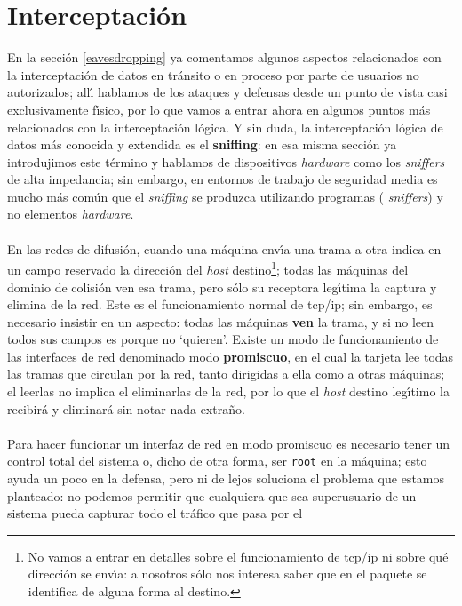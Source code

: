 \section{Interceptaci\'on}
En la secci\'on \ref{eavesdropping} ya comentamos algunos aspectos relacionados
con la interceptaci\'on de datos en tr\'ansito o en proceso por parte de
usuarios no autorizados; all\'{\i} hablamos de los ataques y defensas desde un 
punto de vista casi exclusivamente f\'{\i}sico, por lo que vamos a entrar
ahora en algunos puntos m\'as relacionados con la interceptaci\'on l\'ogica. Y
sin duda, la interceptaci\'on l\'ogica de datos m\'as conocida y extendida es 
el {\bf sniffing}: en esa misma secci\'on ya introdujimos este t\'ermino y 
hablamos de dispositivos {\it hardware} como los {\it sniffers} de alta 
impedancia; sin embargo, en entornos de trabajo de seguridad media es mucho 
m\'as com\'un que el {\it sniffing} se produzca utilizando programas ({\it
sniffers}) y no elementos {\it hardware}.\\
\\En las redes de difusi\'on, cuando una m\'aquina env\'{\i}a una trama a otra
indica en un campo reservado la direcci\'on del {\it host} destino\footnote{No 
vamos a entrar en detalles sobre el funcionamiento de {\sc tcp/ip} ni sobre 
qu\'e direcci\'on se env\'{\i}a: a nosotros s\'olo nos interesa saber que en el 
paquete se identifica de alguna forma al destino.}; todas las m\'aquinas del
dominio de colisi\'on ven esa trama, pero s\'olo su receptora leg\'{\i}tima la
captura y elimina de la red. Este es el funcionamiento normal de {\sc tcp/ip}; 
sin embargo, es necesario insistir en un aspecto: todas las m\'aquinas {\bf 
ven} la trama, y si no leen todos sus campos es porque no `quieren'. Existe un 
modo de funcionamiento de las interfaces de red denominado modo {\bf 
promiscuo}, en el cual la tarjeta lee todas las tramas que circulan por la red, 
tanto dirigidas a ella como a otras m\'aquinas; el leerlas no implica el 
eliminarlas de la red, por lo que el {\it host} destino leg\'{\i}timo la
recibir\'a y eliminar\'a sin notar nada extra\~no.\\
\\Para hacer funcionar un interfaz de red en modo promiscuo es necesario tener 
un control total del sistema o, dicho de otra forma, ser {\tt root} en la 
m\'aquina; esto ayuda un poco en la defensa, pero ni de lejos soluciona el 
problema que estamos planteado: no podemos permitir que cualquiera que sea 
superusuario de un sistema pueda capturar todo el tr\'afico que pasa por el
